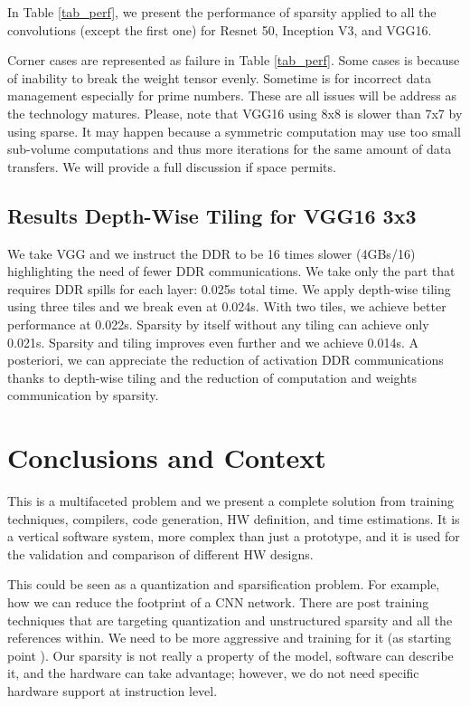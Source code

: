 \documentclass[sigconf]{acmart}
\begin{document}
In Table \ref{tab_perf}, we present the performance of sparsity
applied to all the convolutions (except the first one) for Resnet 50,
Inception V3, and VGG16.

Corner cases are represented as failure in Table \ref{tab_perf}. Some
cases is because of inability to break the weight tensor evenly.
Sometime is for incorrect data management especially for prime
numbers. These are all issues will be address as the technology
matures. Please, note that VGG16 using 8x8 is slower than 7x7 by using
sparse.  It may happen because a symmetric computation may use too
small sub-volume computations and thus more iterations for the same
amount of data transfers. We will provide a full discussion if space
permits.

\subsection{Results Depth-Wise Tiling for VGG16 3x3}
\label{sec:res-depth}

We take VGG and we instruct the DDR to be 16 times slower (4GBs/16)
highlighting the need of fewer DDR communications. We take only the
part that requires DDR spills for each layer: 0.025s total time.  We
apply depth-wise tiling using three tiles and we break even at
0.024s. With two tiles, we achieve better performance at
0.022s. Sparsity by itself without any tiling can achieve only
0.021s. Sparsity and tiling improves even further and we achieve
0.014s. A posteriori, we can appreciate the reduction of activation
DDR communications thanks to depth-wise tiling and the reduction of
computation and weights communication by sparsity.


\section{Conclusions and Context}
This is a multifaceted problem and we present a complete solution from
training techniques, compilers, code generation, HW definition, and
time estimations. It is a vertical software system, more complex than
just a prototype, and it is used for the validation and comparison of
different HW designs.

This could be seen as a quantization and sparsification problem. For
example, how we can reduce the footprint of a CNN network. There are
post training techniques that are targeting quantization and
unstructured sparsity \cite{frantar2023gptq} and all the references
within. We need to be more aggressive and training for it (as starting
point \cite{abs-2102-11289}).  Our sparsity is not really a property
of the model, software can describe it, and the hardware can take
advantage; however, we do not need specific hardware support at
instruction level.
\end{document}

